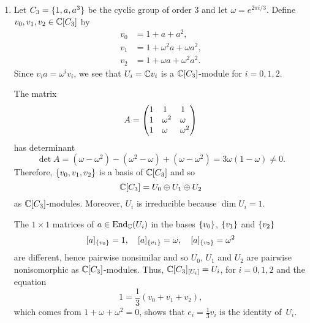 \begin{xmpls}\label{xmpls:irreducible-decomposition}${}$
\begin{enumerate}[\rm a)]
    \item Let $C_3=\{1,a,a^3\}$ be the cyclic group of order $3$ and let $\omega = e^{2\pi i/3}$.
    Define $v_0, v_1, v_2 \in \mathbb{C}[C_3]$ by
    \begin{align*}
        v_0 &= 1 + a + a^2, \\
        v_1 &= 1 + \omega^2 a + \omega a^2, \\
        v_2 &= 1 + \omega a + \omega^2 a^2.
    \end{align*}
    Since $v_ia=\omega^iv_i$, we see that $U_i=\mathbb{C} v_i$ is a $\mathbb{C}[C_3]$-module for $i=0,1,2$.

    The matrix
    $$
        A=\begin{pmatrix}
            1   &1\hphantom{{}^2}       &1\hphantom{{}^2}\\
            1   &\omega^2               &\omega\hphantom{{}^2}\\
            1   &\omega\hphantom{{}^2}  &\omega^2
        \end{pmatrix}
    $$
    has determinant
    $$
        \det A
            = (\omega-\omega^2) - (\omega^2-\omega)
                + (\omega-\omega^2)
            =3\omega(1-\omega) \ne 0.
    $$
    Therefore, $\{v_0,v_1,v_2\}$ is a basis of $\mathbb{C}[C_3]$ and so
    $$
        \mathbb{C}[C_3] = U_0\oplus U_1\oplus U_2
    $$
    as $\mathbb{C}[C_3]$-modules. Moreover, $U_i$ is irreducible because $\dim U_i=1$.
    
    The $1\times1$ matrices of $a\in{\operatorname{End}}_{\mathbb{C}}(U_i)$ in the bases $\{v_0\}$, $\{v_1\}$ and $\{v_2\}$
    $$
        [a]_{\{v_0\}}=1,\quad [a]_{\{v_1\}}=\omega,\quad
            [a]_{\{v_2\}}=\omega^2
    $$
    are different, hence pairwise nonsimilar and so $U_0$, $U_1$ and $U_2$ are pairwise nonisomorphic as $\mathbb{C}[C_3]$-modules. Thus, $\mathbb{C}[C_3]_{[U_i]}=U_i$, for $i=0,1,2$ and the equation
    $$
        1 = \frac13(v_0+v_1+v_2),
    $$
    which comes from $1+\omega+\omega^2=0$, shows that $e_i=\frac13 v_i$ is the identity of~$U_i$.


\end{enumerate}
\end{xmpls}
